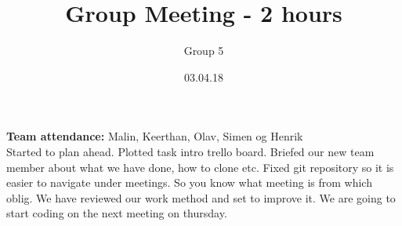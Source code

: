 \documentclass{article}
\title{Group Meeting - 2 hours}
\author{Group 5}
\date{03.04.18}
\begin{document}
	\maketitle
	\noindent
	\textbf{Team attendance:} Malin, Keerthan, Olav, Simen og Henrik \\

	\noindent
	Started to plan ahead. Plotted task intro trello board. Briefed our new team member about what we have done, how to clone etc.
	Fixed git repository so it is easier to navigate under meetings. So you know what meeting is from which oblig.
	We have reviewed our work method and set to improve it. We are going to start coding on the next meeting on thursday. 
\end{document}
